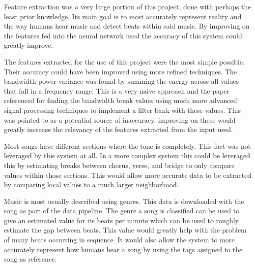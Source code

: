 Feature extraction was a very large portion of this project, done with perhaps the least prior knowledge. Its main goal is to most accurately represent reality and the way humans hear music and detect beats within said music. By improving on the features fed into the neural network used the accuracy of this system could greatly improve.

The features extracted for the use of this project were the most simple possible. Their accuracy could have been improved using more refined techniques. The bandwidth power variance was found by summing the energy across all values that fall in a frequency range. This is a very naive approach and the paper referenced for finding the bandwidth break values using much more advanced signal processing techniques to implement a filter bank with these values. This was pointed to as a potential source of inaccuracy, improving on these would greatly increase the relevancy of the features extracted from the input used.

Most songs have different sections where the tone is completely. This fact was not leveraged by this system at all. In a more complex system this could be leveraged this by estimating breaks between chorus, verse, and bridge to only compare values within those sections. This would allow more accurate data to be extracted by comparing local values to a much larger neighborhood.

Music is most usually described using genres. This data is downloaded with the song as part of the data pipeline. The genre a song is classified can be used to give an estimated value for its beats per minute which can be used to roughly estimate the gap between beats. This value would greatly help with the problem of many beats occurring in sequence. It would also allow the system to more accurately represent how humans hear a song by using the tags assigned to the song as reference.
